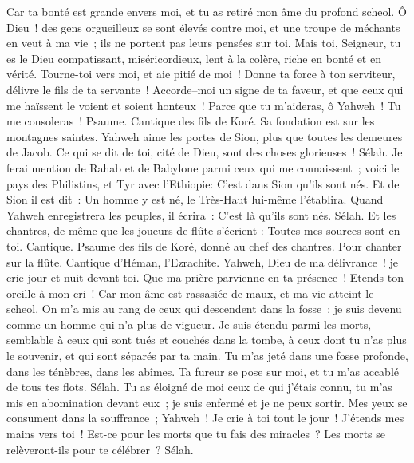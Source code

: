 \begin{multicols}{2}
Car ta bonté est grande envers moi, et tu as retiré mon âme du profond scheol.
Ô Dieu~! des gens orgueilleux se sont élevés contre moi, et une troupe de méchants en veut à ma vie~; ils ne portent pas leurs pensées sur toi.
Mais toi, Seigneur, tu es le Dieu compatissant, miséricordieux, lent à la colère, riche en bonté et en vérité.
Tourne-toi vers moi, et aie pitié de moi~! Donne ta force à ton serviteur, délivre le fils de ta servante~!
Accorde–moi un signe de ta faveur, et que ceux qui me haïssent le voient et soient honteux~! Parce que tu m'aideras, ô Yahweh~! Tu me consoleras~!
\VerseOne{}Psaume. Cantique des fils de Koré. Sa fondation est sur les montagnes saintes.
Yahweh aime les portes de Sion, plus que toutes les demeures de Jacob.
Ce qui se dit de toi, cité de Dieu, sont des choses glorieuses~! Sélah.
Je ferai mention de Rahab et de Babylone parmi ceux qui me connaissent~; voici le pays des Philistins, et Tyr avec l'Ethiopie: C'est dans Sion qu'ils sont nés.
Et de Sion il est dit~: Un homme y est né, le Très-Haut lui-même l'établira.
Quand Yahweh enregistrera les peuples, il écrira~: C'est là qu'ils sont nés. Sélah.
Et les chantres, de même que les joueurs de flûte s'écrient : Toutes mes sources sont en toi.
\VerseOne{}Cantique. Psaume des fils de Koré, donné au chef des chantres. Pour chanter sur la flûte. Cantique d'Héman, l'Ezrachite.
Yahweh, Dieu de ma délivrance~! je crie jour et nuit devant toi.
Que ma prière parvienne en ta présence~! Etends ton oreille à mon cri~!
Car mon âme est rassasiée de maux, et ma vie atteint le scheol.
On m'a mis au rang de ceux qui descendent dans la fosse~; je suis devenu comme un homme qui n'a plus de vigueur.
Je suis étendu parmi les morts, semblable à ceux qui sont tués et couchés dans la tombe, à ceux dont tu n'as plus le souvenir, et qui sont séparés par ta main.
Tu m'as jeté dans une fosse profonde, dans les ténèbres, dans les abîmes.
Ta fureur se pose sur moi, et tu m'as accablé de tous tes flots. Sélah.
Tu as éloigné de moi ceux de qui j'étais connu, tu m'as mis en abomination devant eux~; je suis enfermé et je ne peux sortir.
Mes yeux se consument dans la souffrance~; Yahweh~! Je crie à toi tout le jour~! J'étends mes mains vers toi~!
Est-ce pour les morts que tu fais des miracles~? Les morts se relèveront-ils pour te célébrer~? Sélah.

\end{multicols}
